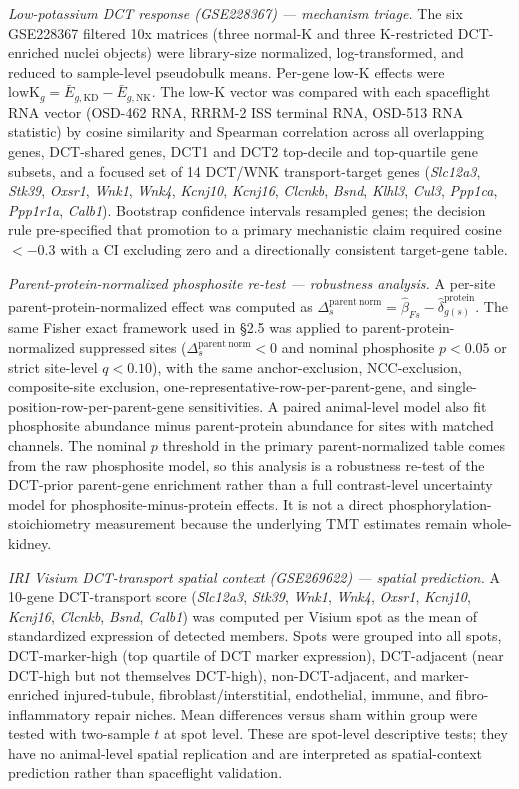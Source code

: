\documentclass[11pt]{article}
\newcommand{\gene}[1]{\textit{#1}}
\begin{document}
\emph{Low-potassium DCT response (GSE228367) --- mechanism triage.} The six GSE228367 filtered 10x matrices (three normal-K and three K-restricted DCT-enriched nuclei objects) were library-size normalized, log-transformed, and reduced to sample-level pseudobulk means. Per-gene low-K effects were $\mathrm{lowK}_g=\bar{E}_{g,\mathrm{KD}}-\bar{E}_{g,\mathrm{NK}}$. The low-K vector was compared with each spaceflight RNA vector (OSD-462 RNA, RRRM-2 ISS terminal RNA, OSD-513 RNA statistic) by cosine similarity and Spearman correlation across all overlapping genes, DCT-shared genes, DCT1 and DCT2 top-decile and top-quartile gene subsets, and a focused set of 14 DCT/WNK transport-target genes (\gene{Slc12a3}, \gene{Stk39}, \gene{Oxsr1}, \gene{Wnk1}, \gene{Wnk4}, \gene{Kcnj10}, \gene{Kcnj16}, \gene{Clcnkb}, \gene{Bsnd}, \gene{Klhl3}, \gene{Cul3}, \gene{Ppp1ca}, \gene{Ppp1r1a}, \gene{Calb1}). Bootstrap confidence intervals resampled genes; the decision rule pre-specified that promotion to a primary mechanistic claim required cosine $<-0.3$ with a CI excluding zero and a directionally consistent target-gene table.

\emph{Parent-protein-normalized phosphosite re-test --- robustness analysis.} A per-site parent-protein-normalized effect was computed as $\Delta_s^{\mathrm{parent\ norm}}=\hat{\beta}_{Fs}-\hat{\delta}_{g(s)}^{\mathrm{protein}}$. The same Fisher exact framework used in §2.5 was applied to parent-protein-normalized suppressed sites ($\Delta_s^{\mathrm{parent\ norm}}<0$ and nominal phosphosite $p<0.05$ or strict site-level $q<0.10$), with the same anchor-exclusion, NCC-exclusion, composite-site exclusion, one-representative-row-per-parent-gene, and single-position-row-per-parent-gene sensitivities. A paired animal-level model also fit phosphosite abundance minus parent-protein abundance for sites with matched channels. The nominal $p$ threshold in the primary parent-normalized table comes from the raw phosphosite model, so this analysis is a robustness re-test of the DCT-prior parent-gene enrichment rather than a full contrast-level uncertainty model for phosphosite-minus-protein effects. It is not a direct phosphorylation-stoichiometry measurement because the underlying TMT estimates remain whole-kidney.

\emph{IRI Visium DCT-transport spatial context (GSE269622) --- spatial prediction.} A 10-gene DCT-transport score (\gene{Slc12a3}, \gene{Stk39}, \gene{Wnk1}, \gene{Wnk4}, \gene{Oxsr1}, \gene{Kcnj10}, \gene{Kcnj16}, \gene{Clcnkb}, \gene{Bsnd}, \gene{Calb1}) was computed per Visium spot as the mean of standardized expression of detected members. Spots were grouped into all spots, DCT-marker-high (top quartile of DCT marker expression), DCT-adjacent (near DCT-high but not themselves DCT-high), non-DCT-adjacent, and marker-enriched injured-tubule, fibroblast/interstitial, endothelial, immune, and fibro-inflammatory repair niches. Mean differences versus sham within group were tested with two-sample $t$ at spot level. These are spot-level descriptive tests; they have no animal-level spatial replication and are interpreted as spatial-context prediction rather than spaceflight validation.
\end{document}
